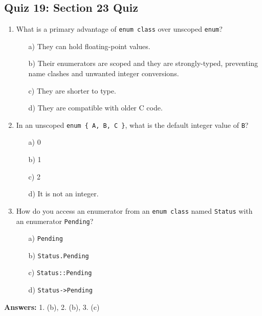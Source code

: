 \subsection{Quiz 19: Section 23 Quiz}
\begin{enumerate}
    \item What is a primary advantage of \texttt{enum class} over unscoped \texttt{enum}?
    \begin{enumerate}
        \item[a)] They can hold floating-point values.
        \item[b)] Their enumerators are scoped and they are strongly-typed, preventing name clashes and unwanted integer conversions.
        \item[c)] They are shorter to type.
        \item[d)] They are compatible with older C code.
    \end{enumerate}

    \item In an unscoped \texttt{enum \{ A, B, C \}}, what is the default integer value of \texttt{B}?
    \begin{enumerate}
        \item[a)] 0
        \item[b)] 1
        \item[c)] 2
        \item[d)] It is not an integer.
    \end{enumerate}

    \item How do you access an enumerator from an \texttt{enum class} named \texttt{Status} with an enumerator \texttt{Pending}?
    \begin{enumerate}
        \item[a)] \texttt{Pending}
        \item[b)] \texttt{Status.Pending}
        \item[c)] \texttt{Status::Pending}
        \item[d)] \texttt{Status->Pending}
    \end{enumerate}
\end{enumerate}

\textbf{Answers:} 1. (b), 2. (b), 3. (c)

